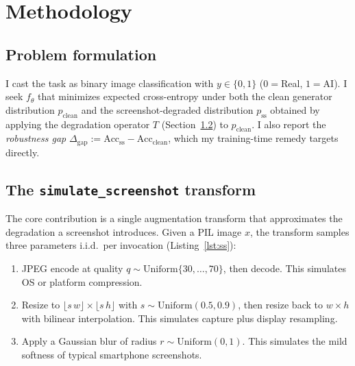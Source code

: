 \documentclass{article}
\begin{document}
\section{Methodology}
\label{sec:method}

\subsection{Problem formulation}
I cast the task as binary image classification with $y \in \{0,1\}$
($0=$Real, $1=$AI). I seek $f_{\theta}$ that minimizes expected
cross-entropy under both the clean generator distribution
$p_{\text{clean}}$ and the screenshot-degraded distribution
$p_{\text{ss}}$ obtained by applying the degradation operator $T$
(Section~\ref{sec:ss-aug}) to $p_{\text{clean}}$. I also report the
\emph{robustness gap} $\Delta_{\text{gap}} := \mathrm{Acc}_{\text{ss}} -
\mathrm{Acc}_{\text{clean}}$, which my training-time remedy targets
directly.

\subsection{The \texttt{simulate\_screenshot} transform}
\label{sec:ss-aug}

The core contribution is a single augmentation transform that
approximates the degradation a screenshot introduces. Given a PIL
image $x$, the transform samples three parameters i.i.d.\ per
invocation (Listing~\ref{lst:ss}):

\begin{enumerate}
  \item JPEG encode at quality $q \sim \mathrm{Uniform}\{30, \ldots, 70\}$,
        then decode. This simulates OS or platform compression.
  \item Resize to $\lfloor s\,w \rfloor \times \lfloor s\,h \rfloor$
        with $s \sim \mathrm{Uniform}(0.5, 0.9)$, then resize back to
        $w \times h$ with bilinear interpolation. This simulates
        capture plus display resampling.
  \item Apply a Gaussian blur of radius $r \sim \mathrm{Uniform}(0, 1)$.
        This simulates the mild softness of typical smartphone
        screenshots.
\end{enumerate}
\end{document}
